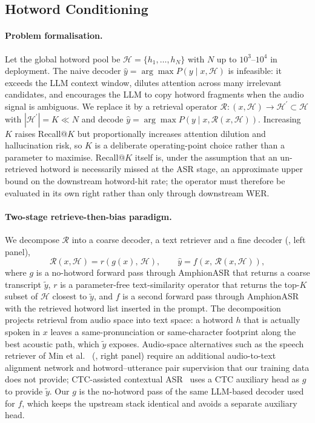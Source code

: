 \subsection{Hotword Conditioning}
\label{sec:hotwords}

\label{subsec:retrieve-algorithm}

\paragraph{Problem formalisation.}
Let the global hotword pool be $\mathcal{H} = \{h_1, \dots, h_N\}$
with $N$ up to $10^3$--$10^4$ in deployment. The naive decoder
$\hat{y} = \arg\max P(y \mid x, \mathcal{H})$ is infeasible: it
exceeds the LLM context window, dilutes attention across many
irrelevant candidates, and encourages the LLM to copy hotword
fragments when the audio signal is ambiguous. We replace it by a
retrieval operator $\mathcal{R}\!:\!(x, \mathcal{H}) \to
\mathcal{H}^\prime \subset \mathcal{H}$ with $|\mathcal{H}^\prime|
= K \ll N$ and decode
$\hat{y} = \arg\max P(y \mid x, \mathcal{R}(x, \mathcal{H}))$.
Increasing $K$ raises Recall@$K$ but proportionally increases
attention dilution and hallucination risk, so $K$ is a deliberate
operating-point choice rather than a parameter to maximise.
Recall@$K$ itself is, under the assumption that an un-retrieved
hotword is necessarily missed at the ASR stage, an approximate
upper bound on the downstream hotword-hit rate; the operator must
therefore be evaluated in its own right rather than only through
downstream WER.

\paragraph{Two-stage retrieve-then-bias paradigm.}
We decompose $\mathcal{R}$ into a coarse decoder, a text retriever
and a fine decoder (, left panel),
\begin{equation}
  \mathcal{R}(x, \mathcal{H})
   = r\!\left(g(x),\, \mathcal{H}\right),\qquad
  \hat{y} = f\!\left(x,\, \mathcal{R}(x, \mathcal{H})\right),
  \label{eq:retrieve-decompose}
\end{equation}
where $g$ is a no-hotword forward pass through AmphionASR that
returns a coarse transcript $\tilde{y}$, $r$ is a parameter-free
text-similarity operator that returns the top-$K$ subset of
$\mathcal{H}$ closest to $\tilde{y}$, and $f$ is a second forward
pass through AmphionASR with the retrieved hotword list inserted in
the prompt. The decomposition projects retrieval from audio space
into text space: a hotword $h$ that is actually spoken in $x$
leaves a same-pronunciation or same-character footprint along the
best acoustic path, which $\tilde{y}$ exposes. Audio-space
alternatives such as the speech retriever of
Min et al.~\cite{min2024speechrag} (, right
panel) require an additional audio-to-text alignment network and
hotword--utterance pair supervision that our training data does
not provide; CTC-assisted
contextual ASR~\cite{yang2024ctc} uses a CTC auxiliary head as $g$
to provide $\tilde{y}$. Our $g$ is the no-hotword pass of the same
LLM-based decoder used for $f$, which keeps the upstream stack
identical and avoids a separate auxiliary head.

